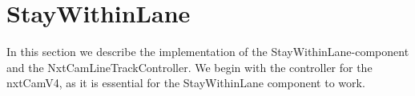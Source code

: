 \section{StayWithinLane}

In this section we describe the implementation of the StayWithinLane-component and the NxtCamLineTrackController. We begin with the controller for the nxtCamV4, as it is essential for the StayWithinLane component to work. 




